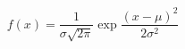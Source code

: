 \documentclass{article}
\begin{document}
\[f(x)=\frac{1}{\sigma\sqrt{2\pi}}\exp{\frac{(x-\mu)^2}{2\sigma^2}}\]
\end{document}
